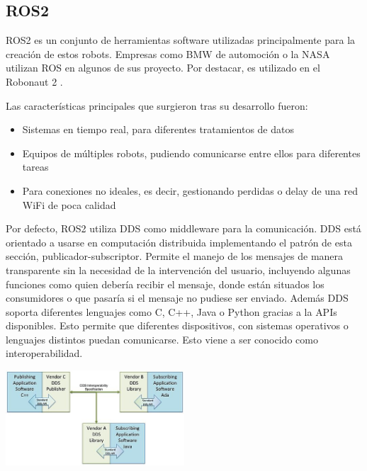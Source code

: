 \subsection{ROS2}

ROS2 \cite{ros2} es un conjunto de herramientas software utilizadas principalmente para la creación de estos robots. Empresas como BMW de automoción o la NASA utilizan ROS en algunos de sus proyecto. Por destacar, es utilizado en el Robonaut 2 \cite{robonaut}.

Las características principales que surgieron tras su desarrollo fueron:

\begin{itemize}
    \item Sistemas en tiempo real, para diferentes tratamientos de datos
    \item Equipos de múltiples robots, pudiendo comunicarse entre ellos para diferentes tareas
    \item Para conexiones no ideales, es decir, gestionando perdidas o delay de una red WiFi de poca calidad
\end{itemize}


Por defecto, ROS2 utiliza \ac{DDS} \cite{dds-omg} como middleware para la comunicación. 
DDS está orientado a usarse en computación distribuida implementando el patrón de esta sección, publicador-subscriptor. Permite el manejo de los mensajes de manera transparente sin la necesidad de la intervención del usuario, incluyendo algunas funciones como quien debería recibir el mensaje, donde están situados los consumidores o que pasaría si el mensaje no pudiese ser enviado. Además DDS soporta diferentes lenguajes como C, C++, Java o Python gracias a la \ac{APIs} disponibles. Esto permite que diferentes dispositivos, con sistemas operativos o lenguajes distintos puedan comunicarse. Esto viene a ser conocido como interoperabilidad.

\begin{center}
    \centering
    \includegraphics[width=0.5\textwidth]{img/03-DDS-Interoperability.jpeg}
    \label{fig:dds-wiki}
\end{center}

